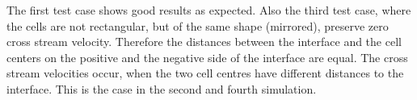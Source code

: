 \documentclass[
	pdftex,             %
	12pt,				%
	a4paper,		   	%
	english,				%
	oneside,			%
]{article}
\begin{document}
The first test case shows good results as expected.
Also the third test case, where the cells are not rectangular, but of the same shape (mirrored), preserve zero cross stream velocity.
Therefore the distances between the interface and the cell centers on the positive and the negative side of the interface are equal.
The cross stream velocities occur, when the two cell centres have different distances to the interface.
This is the case in the second and fourth simulation.
\end{document}
